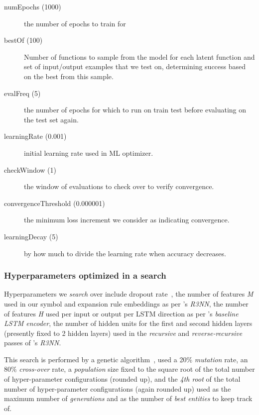 \documentclass{article}
\begin{document}
\begin{description}
    \item[numEpochs (1000)] the number of epochs to train for 
    \item[bestOf (100)] Number of functions to sample from the model for each latent function and set of input/output examples that we test on, determining success based on the best from this sample.
    \item[evalFreq (5)] the number of epochs for which to run on train test before evaluating on the test set again.
    \item[learningRate (0.001)] initial learning rate used in ML optimizer.
    \item[checkWindow (1)] the window of evaluations to check over to verify convergence.
    \item[convergenceThreshold (0.000001)] the minimum loss increment we consider as indicating convergence.
    \item[learningDecay (5)] by how much to divide the learning rate when accuracy decreases.
\end{description}


\subsubsection{Hyperparameters optimized in a search}

Hyperparameters we \emph{search} over include
dropout rate~\citep{baldi2014dropout},
the number of features \emph{M} used in our symbol and expansion rule embeddings as per \citet{nsps}'s \emph{R3NN},
the number of features \emph{H} used per input or output per LSTM direction as per \citet{nsps}'s \emph{baseline LSTM encoder},
the number of hidden units for the first and second hidden layers (presently fixed to 2 hidden layers) used in the \emph{recursive} and \emph{reverse-recursive} passes of \citet{nsps}'s \emph{R3NN}.

This search is performed by a genetic algorithm~\citep{koza1994genetic},
used a 20\% \emph{mutation} rate,
an 80\% \emph{cross-over} rate,
a \emph{population} size fixed to the square root of the total number of hyper-parameter configurations (rounded up),
and the \emph{4th root} of the total number of hyper-parameter configurations (again rounded up)
used as the maximum number of \emph{generations} and as the number of \emph{best entities} to keep track of.
\end{document}
